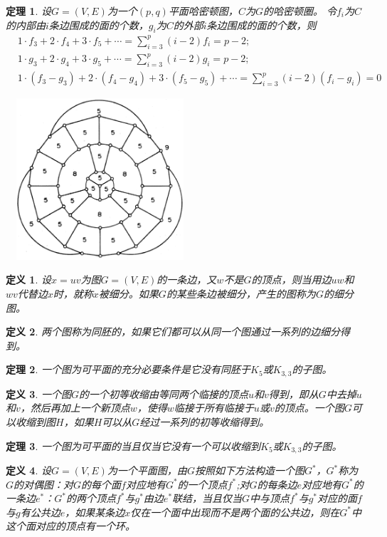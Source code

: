 \documentclass{book}[oneside]
\newtheorem{Def}{定义}[chapter]
\newtheorem{Thm}{定理}[chapter]
\begin{document}
\begin{CJK*}{UTF8}{gbsn}
  \begin{Thm}
    设$G=(V,E)$为一个$(p,q)$平面哈密顿图，$C$为$G$的哈密顿圈。
    令$f_i$为$C$的内部由$i$条边围成的面的个数，$g_i$为$C$的外部$i$条边围成的面的个数，则
    \begin{align}
      &1 \cdot f_3 + 2 \cdot f_4 + 3 \cdot f_5 + \cdots = \sum_{i=3}^p(i-2)f_i = p - 2;\\
      &1 \cdot g_3 + 2 \cdot g_4 + 3 \cdot g_5 + \cdots = \sum_{i=3}^p(i-2)g_i = p - 2;\\
      &1 \cdot (f_3 - g_3) + 2 \cdot (f_4 - g_4) + 3 \cdot (f_5 - g_5) + \cdots = \sum_{i=3}^p(i-2)(f_i - g_i) = 0
    \end{align}
  \end{Thm}
    \centering
  \includegraphics[width=7cm, height=6cm]{grinberg}
  \begin{Def}
    设$x=uv$为图$G=(V,E)$的一条边，又$w$不是$G$的顶点，则当用边$uw$和$wv$代替边$x$时，就称$x$被细分。如果$G$的某些条边被细分，产生的图称为$G$的细分图。
  \end{Def}
  \begin{Def}
    两个图称为同胚的，如果它们都可以从同一个图通过一系列的边细分得到。
  \end{Def}
  \begin{Thm}
    一个图为可平面的充分必要条件是它没有同胚于$K_5$或$K_{3,3}$的子图。
  \end{Thm}
  \begin{Def}
    一个图$G$的一个初等收缩由等同两个临接的顶点$u$和$v$得到，即从$G$中去掉$u$和$v$，然后再加上一个新顶点$w$，使得$w$临接于所有临接于$u$或$v$的顶点。一个图$G$可以收缩到图$H$，如果$H$可以从$G$经过一系列的初等收缩得到。
  \end{Def}
  \begin{Thm}
    一个图为可平面的当且仅当它没有一个可以收缩到$K_5$或$K_{3,3}$的子图。
  \end{Thm}
  \begin{Def}
    设$G=(V,E)$为一个平面图，由$G$按照如下方法构造一个图$G^*$，$G^*$称为$G$的对偶图：对$G$的每个面$f$对应地有$G^*$的一个顶点$f^*$;对$G$的每条边$e$对应地有$G^*$的一条边$e^*$：$G^*$的两个顶点$f^*$与$g^*$由边$e^*$联结，当且仅当$G$中与顶点$f^*$与$g^*$对应的面$f$与$g$有公共边$e$，如果某条边$x$仅在一个面中出现而不是两个面的公共边，则在$G^*$中这个面对应的顶点有一个环。

\end{Def}
\end{CJK*}
\end{document}
